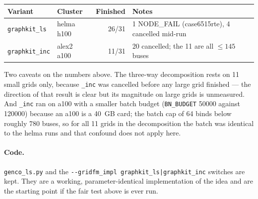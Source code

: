 \documentclass[10pt]{article}
\begin{document}
\begin{table}[H]
\centering\small
\begin{tabular}{llrl}
\toprule
Variant & Cluster & Finished & Notes \\
\midrule
\texttt{graphkit\_ls}  & helma h100 & 26/31 & 1 NODE\_FAIL (case6515rte), 4 cancelled mid-run \\
\texttt{graphkit\_inc} & alex2 a100 & 11/31 & 20 cancelled; the 11 are all $\leq 145$ buses \\
\bottomrule
\end{tabular}
\end{table}

Two caveats on the numbers above. The three-way decomposition rests on 11 small
grids only, because \texttt{\_inc} was cancelled before any large grid finished
--- the direction of that result is clear but its magnitude on large grids is
unmeasured. And \texttt{\_inc} ran on a100 with a smaller batch budget
(\texttt{BN\_BUDGET} 50000 against 120000) because an a100 is a 40~GB card; the
batch cap of 64 binds below roughly 780 buses, so for all 11 grids in the
decomposition the batch was identical to the helma runs and that confound does
not apply here.

\paragraph{Code.} \texttt{genco\_ls.py} and the
\texttt{-{}-gridfm\_impl graphkit\_ls|graphkit\_inc} switches are kept. They are
a working, parameter-identical implementation of the idea and are the starting
point if the fair test above is ever run.
\end{document}
